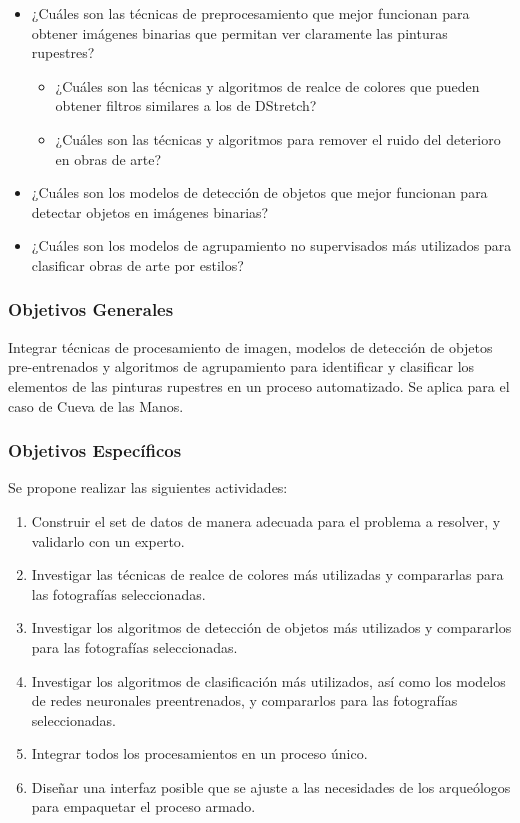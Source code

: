 \begin{itemize}
    \item ¿Cuáles son las técnicas de preprocesamiento que mejor funcionan para obtener imágenes binarias que permitan ver claramente las pinturas rupestres?
    \begin{itemize}
        \item ¿Cuáles son las técnicas y algoritmos de realce de colores que pueden obtener filtros similares a los de DStretch?
        \item ¿Cuáles son las técnicas y algoritmos para remover el ruido del deterioro en obras de arte?
    \end{itemize}
    \item ¿Cuáles son los modelos de detección de objetos que mejor funcionan para detectar objetos en imágenes binarias?
    \item ¿Cuáles son los modelos de agrupamiento no supervisados más utilizados para clasificar obras de arte por estilos?
\end{itemize}

\subsubsection{Objetivos Generales}

Integrar técnicas de procesamiento de imagen, modelos de detección de objetos pre-entrenados y algoritmos de agrupamiento para identificar y clasificar los elementos de las pinturas rupestres en un proceso automatizado. Se aplica para el caso de Cueva de las Manos.

\subsubsection{Objetivos Específicos}

Se propone realizar las siguientes actividades:
\begin{enumerate}
    \item Construir el set de datos de manera adecuada para el problema a resolver, y validarlo con un experto.
    \item Investigar las técnicas de realce de colores más utilizadas y compararlas para las fotografías seleccionadas.
    \item Investigar los algoritmos de detección de objetos más utilizados y compararlos para las fotografías seleccionadas.
    \item Investigar los algoritmos de clasificación más utilizados, así como los modelos de redes neuronales preentrenados, y compararlos para las fotografías seleccionadas.
    \item Integrar todos los procesamientos en un proceso único.
    \item Diseñar una interfaz posible que se ajuste a las necesidades de los arqueólogos para empaquetar el proceso armado.
\end{enumerate}

